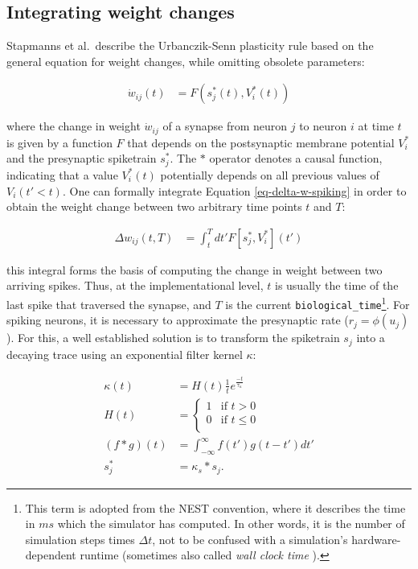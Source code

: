 \subsection{Integrating weight changes}


Stapmanns et al.\ describe the Urbanczik-Senn plasticity rule based on the general equation for weight changes, while
omitting obsolete parameters:

\begin{align}
  \dot{w}_{ij}(t) & = F(s_j^\ast (t), V_i^\ast (t)) \label{eq-delta-w-spiking}
\end{align}

where the change in weight $\dot{w}_{ij}$ of a synapse from neuron $j$ to neuron $i$ at time $t$ is given by a function
$F$ that depends on the postsynaptic membrane potential $V_i^\ast$ and the presynaptic spiketrain $s_j^\ast$. The $\ast$
operator denotes a causal function, indicating that a value $V_i^\ast(t)$ potentially depends on all previous values of
$V_i(t' < t)$. One can formally integrate Equation \ref{eq-delta-w-spiking} in order to obtain the weight change between
two arbitrary time points $t$ and $T$:

\begin{align}
  \Delta w_{ij}(t,T) & = \int_t^T dt' F[s_j^\ast, V_i^\ast](t') \label{eq-delta-w-t-T}
\end{align}

this integral forms the basis of computing the change in weight between two arriving spikes. Thus, at the
implementational level, $t$ is usually the time of the last spike that traversed the synapse, and $T$ is the current
\texttt{biological\_time}\footnote{This term is adopted from the NEST convention, where it describes the time in $ms$
which the simulator has computed. In other words, it is the number of simulation steps times $\Delta t$, not to be
confused with a simulation's hardware-dependent runtime (sometimes also called \textit{wall clock time}
\citep{albada2018performance}). }. For spiking neurons, it is necessary to approximate the presynaptic rate
($r_j=\phi(u_j)$). For this, a well established solution is to transform the spiketrain $s_j$ into a decaying trace
using an exponential filter kernel $\kappa$:

\begin{align}
  \kappa(t)     & = H(t) \frac{1}{t}e^{\frac{-t}{\tau_{\kappa}}}                        \\
  H(t)          & =
  \begin{cases}
    1 & \text{if $t > 0$}    \\
    0 & \text{if $t \leq 0$} \\
  \end{cases}                                                              \\
  (f \ast g)(t) & = \int_{- \infty }^{\infty} f(t') g(t-t') d t' \label{eq-convolution} \\
  s_j^\ast      & = \kappa_s \ast s_j. \label{eq-spike-trace}
\end{align}

